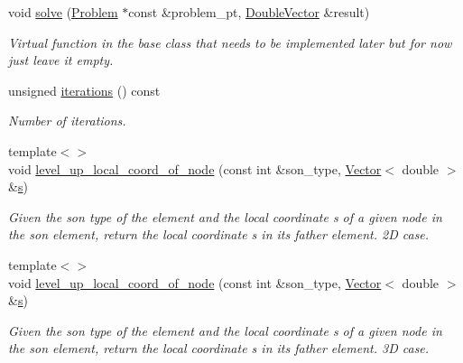\begin{DoxyCompactItemize}
void \hyperlink{classoomph_1_1MGSolver_a68f8c874b922c5b67e73c836048e34f5}{solve} (\hyperlink{classoomph_1_1Problem}{Problem} $\ast$const \&problem\+\_\+pt, \hyperlink{classoomph_1_1DoubleVector}{Double\+Vector} \&result)
\begin{DoxyCompactList}\small\item\em Virtual function in the base class that needs to be implemented later but for now just leave it empty. \end{DoxyCompactList}\item 
unsigned \hyperlink{classoomph_1_1MGSolver_ace1b91d44c67c990259807ee746a6363}{iterations} () const
\begin{DoxyCompactList}\small\item\em Number of iterations. \end{DoxyCompactList}\item 
{\footnotesize template$<$$>$ }\\void \hyperlink{classoomph_1_1MGSolver_afff71f3ed398a96105afb1e543085a80}{level\+\_\+up\+\_\+local\+\_\+coord\+\_\+of\+\_\+node} (const int \&son\+\_\+type, \hyperlink{classoomph_1_1Vector}{Vector}$<$ double $>$ \&\hyperlink{cfortran_8h_ab7123126e4885ef647dd9c6e3807a21c}{s})
\begin{DoxyCompactList}\small\item\em Given the son type of the element and the local coordinate s of a given node in the son element, return the local coordinate s in its father element. 2D case. \end{DoxyCompactList}\item 
{\footnotesize template$<$$>$ }\\void \hyperlink{classoomph_1_1MGSolver_a10d5478cec29adc2f6cba923e32ece27}{level\+\_\+up\+\_\+local\+\_\+coord\+\_\+of\+\_\+node} (const int \&son\+\_\+type, \hyperlink{classoomph_1_1Vector}{Vector}$<$ double $>$ \&\hyperlink{cfortran_8h_ab7123126e4885ef647dd9c6e3807a21c}{s})
\begin{DoxyCompactList}\small\item\em Given the son type of the element and the local coordinate s of a given node in the son element, return the local coordinate s in its father element. 3D case. \end{DoxyCompactList}\end{DoxyCompactItemize}
